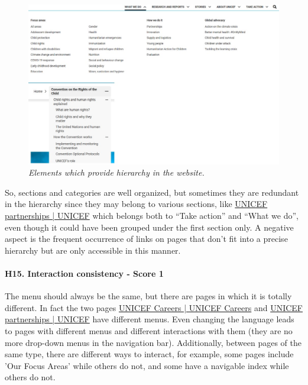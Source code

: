 \begin{figure}[!h]
	\begin{center}
		\includegraphics[width=\textwidth]{FinalScores18.jpg}
		\captionsetup{font=small}
		\caption{\textit{Elements which provide hierarchy in the website.}}
	\end{center}
\end{figure}
\newline
So, sections and categories are well organized, but sometimes they are redundant in the hierarchy since they may belong to various sections, like \href{https://www.unicef.org/partnerships}{UNICEF partnerships | UNICEF} which belongs both to “Take action” and “What we do”, even though it could have been grouped under the first section only. 
\newline A negative aspect is the frequent occurrence of links on pages that don't fit into a precise hierarchy but are only accessible in this manner.
\newline
\newline \paragraph{H15. Interaction consistency - Score 1}	\label{subsec:H15}The menu should always be the same, but there are pages in which it is totally different. In fact the two pages \href{https://www.unicef.org/careers/}{UNICEF Careers | UNICEF Careers} and \href{https://www.unicef.org/partnerships}{UNICEF partnerships | UNICEF} have different menus. Even changing the language leads to pages with different menus and different interactions with them (they are no more drop-down menus in the navigation bar).
\newline Additionally, between pages of the same type, there are different ways to interact, for example, some pages include 'Our Focus Areas' while others do not, and some have a navigable index while others do not.
